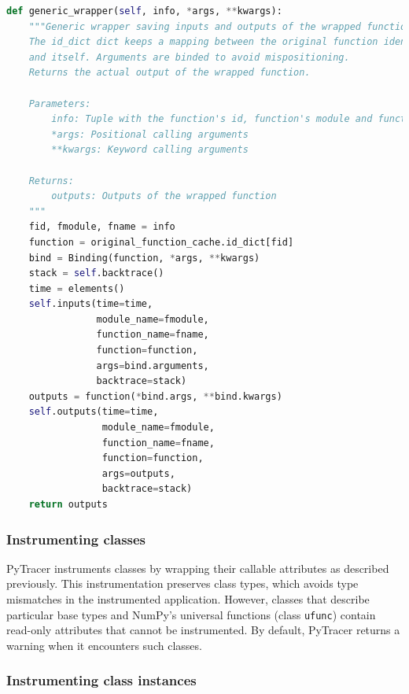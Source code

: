 \documentclass[11pt]{article}
\newcommand{\pytracer}[0]{PyTracer\xspace}
\begin{document}
\begin{listing}
    \centering
\begin{lstlisting}[language=Python,style=customPython,]
def generic_wrapper(self, info, *args, **kwargs):
    """Generic wrapper saving inputs and outputs of the wrapped function.
    The id_dict dict keeps a mapping between the original function identifier
    and itself. Arguments are binded to avoid mispositioning.
    Returns the actual output of the wrapped function.
    
    Parameters:
        info: Tuple with the function's id, function's module and function's name
        *args: Positional calling arguments
        **kwargs: Keyword calling arguments
    
    Returns:
        outputs: Outputs of the wrapped function
    """
    fid, fmodule, fname = info
    function = original_function_cache.id_dict[fid]
    bind = Binding(function, *args, **kwargs)
    stack = self.backtrace()
    time = elements()
    self.inputs(time=time,
                module_name=fmodule,
                function_name=fname,
                function=function,
                args=bind.arguments,
                backtrace=stack)
    outputs = function(*bind.args, **bind.kwargs)
    self.outputs(time=time,
                 module_name=fmodule,
                 function_name=fname,
                 function=function,
                 args=outputs,
                 backtrace=stack)
    return outputs
\end{lstlisting}
    \caption{\pytracer's generic wrapper function that saves
    the inputs and outputs of the wrapped function.}
    \label{fig:generic_wrapper}
\end{listing}


\subsubsection{Instrumenting classes}

\pytracer instruments classes by wrapping their callable attributes as described previously. 
This instrumentation preserves class types, which avoids type mismatches in the instrumented application.
However, classes that describe particular base types and NumPy's universal functions (class \texttt{ufunc}) contain read-only attributes that cannot be instrumented.
By default, \pytracer returns a warning when it encounters such classes. 

\subsubsection{Instrumenting class instances}
\end{document}
